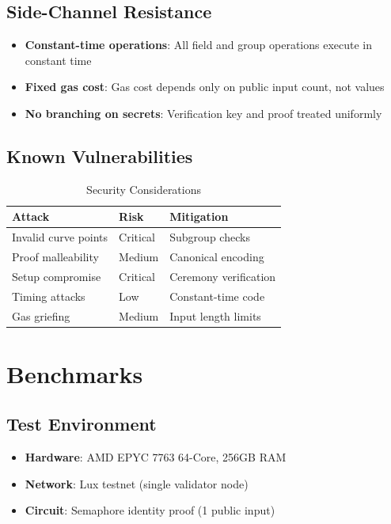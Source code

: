\documentclass[11pt,a4paper]{article}
\theoremstyle{definition}
\begin{document}
\subsection{Side-Channel Resistance}

\begin{itemize}
    \item \textbf{Constant-time operations}: All field and group operations execute in constant time
    \item \textbf{Fixed gas cost}: Gas cost depends only on public input count, not values
    \item \textbf{No branching on secrets}: Verification key and proof treated uniformly
\end{itemize}

\subsection{Known Vulnerabilities}

\begin{table}[h]
\centering
\caption{Security Considerations}
\begin{tabular}{lll}
\toprule
Attack & Risk & Mitigation \\
\midrule
Invalid curve points & Critical & Subgroup checks \\
Proof malleability & Medium & Canonical encoding \\
Setup compromise & Critical & Ceremony verification \\
Timing attacks & Low & Constant-time code \\
Gas griefing & Medium & Input length limits \\
\bottomrule
\end{tabular}
\end{table}

\section{Benchmarks}

\subsection{Test Environment}

\begin{itemize}
    \item \textbf{Hardware}: AMD EPYC 7763 64-Core, 256GB RAM
    \item \textbf{Network}: Lux testnet (single validator node)
    \item \textbf{Circuit}: Semaphore identity proof (1 public input)
\end{itemize}
\end{document}
